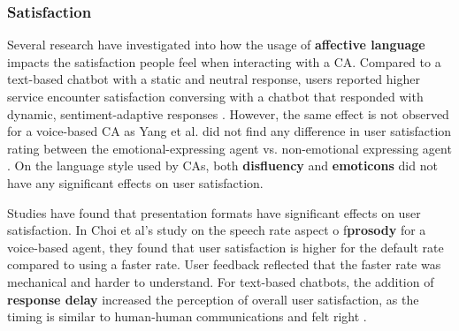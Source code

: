 \documentclass[sigconf,screen,review, anonymous]{acmart}
\newcommand{\cmt}[1]{}%
\begin{document}
%


%


\subsubsection{Satisfaction}
Several research have investigated into how the usage of \textbf{affective language} impacts the satisfaction people feel when interacting with a CA. Compared to a text-based chatbot with a static and neutral response, users reported higher service encounter satisfaction conversing with a chatbot that responded with dynamic, sentiment-adaptive responses \cite{diederich2019emulating}\cmt{[25]}. However, the same effect is not observed for a voice-based CA as Yang et al. did not find any difference in user satisfaction rating between the emotional-expressing agent vs. non-emotional expressing agent \cite{yang2017perceived}\cmt{[44]}. On the language style used by CAs, both \textbf{disfluency} \cite{pfeifer2009should}\cmt{[12]} and \textbf{emoticons} \cite{wilhelm2022keep}\cmt{[28]} did not have any significant effects on user satisfaction.



%



Studies have found that presentation formats have significant effects on user satisfaction. In Choi et al's study \cite{choi2020nobody}\cmt{[54]} on the speech rate aspect o f\textbf{prosody} for a voice-based agent, they found that user satisfaction is higher for the default rate compared to using a faster rate. User feedback reflected that the faster rate was mechanical and harder to understand. For text-based chatbots, the addition of \textbf{response delay} increased the perception of overall user satisfaction, as the timing is similar to human-human communications and felt right \cite{gnewuch2018faster}\cmt{[19]}. 
\end{document}
